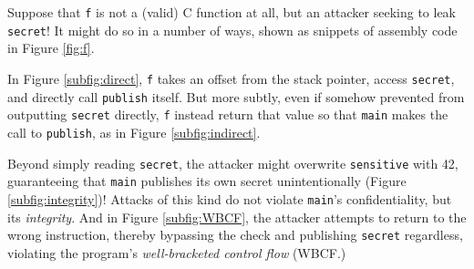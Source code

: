 \documentclass[10pt,conference]{ieeetran}%
\theoremstyle{definition}
\begin{document}
Suppose that {\tt f} is not a (valid) C function at all, but an attacker seeking
to leak {\tt secret}! It might do so in a number of ways, shown as snippets of
assembly code in Figure \ref{fig:f}.

In Figure \ref{subfig:direct}, {\tt f} takes an offset from the stack
pointer, access {\tt secret}, and directly call {\tt publish} itself. But more
subtly, even if somehow prevented from outputting {\tt secret} directly, {\tt f}
instead return that value so that {\tt main} makes the call to {\tt publish},
as in Figure \ref{subfig:indirect}.

Beyond simply reading {\tt secret}, the attacker might overwrite {\tt sensitive}
with 42, guaranteeing that {\tt main} publishes its own secret unintentionally
(Figure \ref{subfig:integrity})!
Attacks of this kind do not violate {\tt main}'s confidentiality, but its
{\it integrity}.
And in Figure \ref{subfig:WBCF}, the attacker attempts to return to the
wrong instruction, thereby bypassing the check and publishing {\tt secret} regardless,
violating the program's {\it well-bracketed control flow} (WBCF.)
\end{document}
